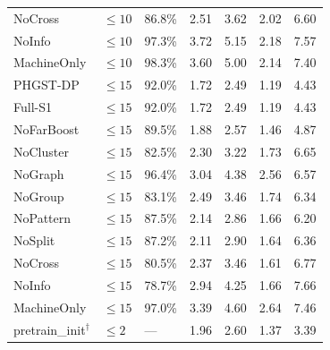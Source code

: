 \begin{table}[p]
\begin{tabularx}{\textwidth}{@{}lXXXXXX@{}}
NoCross & $\le 10$ & 86.8\% & 2.51 & 3.62 & 2.02 & 6.60 \\
NoInfo & $\le 10$ & 97.3\% & 3.72 & 5.15 & 2.18 & 7.57 \\
MachineOnly & $\le 10$ & 98.3\% & 3.60 & 5.00 & 2.14 & 7.40 \\
\midrule
PHGST-DP & $\le 15$ & 92.0\% & 1.72 & 2.49 & 1.19 & 4.43 \\
Full-S1 & $\le 15$ & 92.0\% & 1.72 & 2.49 & 1.19 & 4.43 \\
NoFarBoost & $\le 15$ & 89.5\% & 1.88 & 2.57 & 1.46 & 4.87 \\
NoCluster & $\le 15$ & 82.5\% & 2.30 & 3.22 & 1.73 & 6.65 \\
NoGraph & $\le 15$ & 96.4\% & 3.04 & 4.38 & 2.56 & 6.57 \\
NoGroup & $\le 15$ & 83.1\% & 2.49 & 3.46 & 1.74 & 6.34 \\
NoPattern & $\le 15$ & 87.5\% & 2.14 & 2.86 & 1.66 & 6.20 \\
NoSplit & $\le 15$ & 87.2\% & 2.11 & 2.90 & 1.64 & 6.36 \\
NoCross & $\le 15$ & 80.5\% & 2.37 & 3.46 & 1.61 & 6.77 \\
NoInfo & $\le 15$ & 78.7\% & 2.94 & 4.25 & 1.66 & 7.66 \\
MachineOnly & $\le 15$ & 97.0\% & 3.39 & 4.60 & 2.64 & 7.46 \\
\midrule
pretrain\_init$^\dagger$ & $\le 2$ & --- & 1.96 & 2.60 & 1.37 & 3.39 \\
\bottomrule
\end{tabularx}
\end{table}


